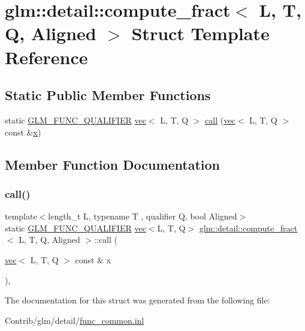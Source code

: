 \hypertarget{structglm_1_1detail_1_1compute__fract}{}\section{glm\+:\+:detail\+:\+:compute\+\_\+fract$<$ L, T, Q, Aligned $>$ Struct Template Reference}
\label{structglm_1_1detail_1_1compute__fract}
\subsection*{Static Public Member Functions}
\begin{DoxyCompactItemize}
\item 
static \mbox{\hyperlink{setup_8hpp_a33fdea6f91c5f834105f7415e2a64407}{G\+L\+M\+\_\+\+F\+U\+N\+C\+\_\+\+Q\+U\+A\+L\+I\+F\+I\+ER}} \mbox{\hyperlink{structglm_1_1vec}{vec}}$<$ L, T, Q $>$ \mbox{\hyperlink{structglm_1_1detail_1_1compute__fract_a45298051657b230289444a764cc573ad}{call}} (\mbox{\hyperlink{structglm_1_1vec}{vec}}$<$ L, T, Q $>$ const \&\mbox{\hyperlink{_s_d_l__opengl_8h_ad0e63d0edcdbd3d79554076bf309fd47}{x}})
\end{DoxyCompactItemize}


\subsection{Member Function Documentation}
\mbox{\label{structglm_1_1detail_1_1compute__fract_a45298051657b230289444a764cc573ad}} 
\subsubsection{\texorpdfstring{call()}{call()}}
{\footnotesize\ttfamily template$<$length\+\_\+t L, typename T , qualifier Q, bool Aligned$>$ \\
static \mbox{\hyperlink{setup_8hpp_a33fdea6f91c5f834105f7415e2a64407}{G\+L\+M\+\_\+\+F\+U\+N\+C\+\_\+\+Q\+U\+A\+L\+I\+F\+I\+ER}} \mbox{\hyperlink{structglm_1_1vec}{vec}}$<$L, T, Q$>$ \mbox{\hyperlink{structglm_1_1detail_1_1compute__fract}{glm\+::detail\+::compute\+\_\+fract}}$<$ L, T, Q, Aligned $>$\+::call (\begin{DoxyParamCaption}\item[{\mbox{\hyperlink{structglm_1_1vec}{vec}}$<$ L, T, Q $>$ const \&}]{x }\end{DoxyParamCaption})\hspace{0.3cm}{\ttfamily [inline]}, {\ttfamily [static]}}



The documentation for this struct was generated from the following file\+:\begin{DoxyCompactItemize}
\item 
Contrib/glm/detail/\mbox{\hyperlink{func__common_8inl}{func\+\_\+common.\+inl}}\end{DoxyCompactItemize}
